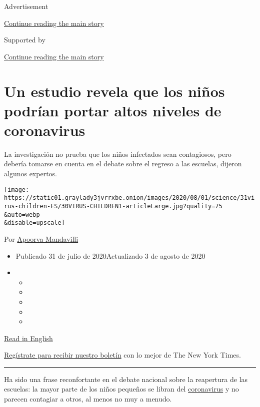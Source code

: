 Advertisement

\protect\hyperlink{after-top}{Continue reading the main story}

Supported by

\protect\hyperlink{after-sponsor}{Continue reading the main story}

\hypertarget{un-estudio-revela-que-los-niuxf1os-podruxedan-portar-altos-niveles-de-coronavirus}{%
\section{Un estudio revela que los niños podrían portar altos niveles de
coronavirus}\label{un-estudio-revela-que-los-niuxf1os-podruxedan-portar-altos-niveles-de-coronavirus}}

La investigación no prueba que los niños infectados sean contagiosos,
pero debería tomarse en cuenta en el debate sobre el regreso a las
escuelas, dijeron algunos expertos.

\texttt{[image: https://static01.graylady3jvrrxbe.onion/images/2020/08/01/science/31virus-children-ES/30VIRUS-CHILDREN1-articleLarge.jpg?quality=75\\\&auto=webp\\\&disable=upscale]}

Por
\href{https://www.nytimes3xbfgragh.onion/by/apoorva-mandavilli}{Apoorva
Mandavilli}

\begin{itemize}
\item
  Publicado 31 de julio de 2020Actualizado 3 de agosto de 2020
\item
  \begin{itemize}
  \item
  \item
  \item
  \item
  \item
  \end{itemize}
\end{itemize}

\href{https://www.nytimes3xbfgragh.onion/2020/07/30/health/coronavirus-children.html}{Read
in English}

\href{https://www.nytimes3xbfgragh.onion/newsletters/el-times}{Regístrate
para recibir nuestro boletín} con lo mejor de The New York Times.

\begin{center}\rule{0.5\linewidth}{\linethickness}\end{center}

Ha sido una frase reconfortante en el debate nacional sobre la
reapertura de las escuelas: la mayor parte de los niños pequeños se
libran del
\href{https://www.nytimes3xbfgragh.onion/es/interactive/2020/espanol/mundo/coronavirus-en-estados-unidos.html}{coronavirus}
y no parecen contagiar a otros, al menos no muy a menudo.

